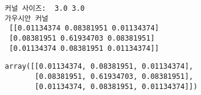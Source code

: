 \documentclass[11pt]{article}
\makeatletter
\newcommand{\boxspacing}{\kern\kvtcb@left@rule\kern\kvtcb@boxsep}
\newcommand{\prompt}[4]{
        {\ttfamily\llap{{\color{#2}[#3]:\hspace{3pt}#4}}\vspace{-\baselineskip}}
    }
\makeatother
\begin{document}
    \begin{Verbatim}[commandchars=\\\{\}]
커널 사이즈:  3.0 3.0
가우시안 커널
 [[0.01134374 0.08381951 0.01134374]
 [0.08381951 0.61934703 0.08381951]
 [0.01134374 0.08381951 0.01134374]]
    \end{Verbatim}

            \begin{tcolorbox}[breakable, size=fbox, boxrule=.5pt, pad at break*=1mm, opacityfill=0]
\prompt{Out}{outcolor}{67}{\boxspacing}
\begin{Verbatim}[commandchars=\\\{\}]
array([[0.01134374, 0.08381951, 0.01134374],
       [0.08381951, 0.61934703, 0.08381951],
       [0.01134374, 0.08381951, 0.01134374]])
\end{Verbatim}
\end{tcolorbox}
        
\end{document}
